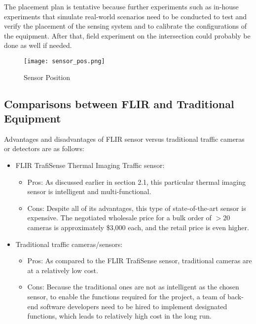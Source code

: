 \documentclass{article}
\begin{document}
The placement plan is tentative because further experiments such as in-house experiments that simulate real-world scenarios need to be conducted to test and verify the placement of the sensing system and to calibrate the configurations of the equipment. After that, field experiment on the intersection could probably be done as well if needed.

\begin{figure}
    \centering
    \texttt{[image: sensor\_pos.png]}
    \caption{Sensor Position}
    \label{fig:sensor_position}
\end{figure}

\subsection{Comparisons between FLIR and Traditional Equipment}
Advantages and disadvantages of FLIR sensor versus traditional traffic cameras or detectors are as follows:

\begin{itemize}

    \item FLIR TrafiSense Thermal Imaging Traffic sensor:
    \begin{itemize}
        \item Pros: As discussed earlier in section 2.1, this particular thermal imaging sensor is intelligent and multi-functional. 
        \item Cons: Despite all of its advantages, this type of state-of-the-art sensor is expensive. The negotiated wholesale price for a bulk order of $>20$ cameras is approximately \$3,000 each, and the retail price is even higher.
    \end{itemize}
    
    \item Traditional traffic cameras/sensors:
    \begin{itemize}
        \item Pros: As compared to the FLIR TrafiSense sensor, traditional cameras are at a relatively low cost.
        \item Cons: Because the traditional ones are not as intelligent as the chosen sensor, to enable the functions required for the project, a team of back-end software developers need to be hired to implement designated functions, which leads to relatively high cost in the long run.
    \end{itemize}
    
\end{itemize}
\end{document}
